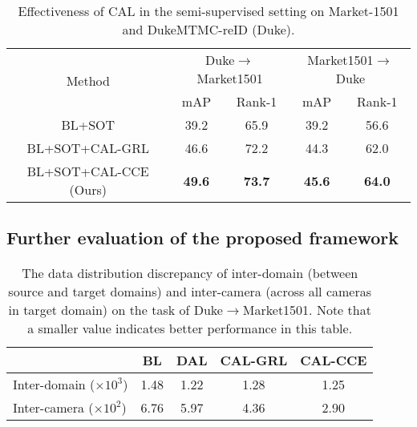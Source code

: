 \documentclass[10pt,twocolumn,letterpaper]{article}
\begin{document}
\begin{table}[htbp]
 \centering
 \caption{Effectiveness of CAL in the semi-supervised setting on Market-1501 and DukeMTMC-reID (Duke).}
 \begin{adjustbox}{width=0.48\textwidth}
   \begin{tabular}{|c|cc|cc|}
   \toprule
   \multirow{2}[2]{*}{Method} & \multicolumn{2}{c|}{Duke$\rightarrow$Market1501} & \multicolumn{2}{c|}{Market1501$\rightarrow$Duke} \\
\cmidrule{2-5}         & mAP  & Rank-1 & mAP  & Rank-1 \\
   \midrule
    BL+SOT & 39.2 & 65.9 & 39.2 & 56.6 \\
    \midrule
   BL+SOT+CAL-GRL & 46.6 & 72.2 & 44.3 & 62.0 \\
   BL+SOT+CAL-CCE (Ours)& \textcolor[rgb]{ 1, 0, 0}{\textbf{49.6}} & \textcolor[rgb]{ 1, 0, 0}{\textbf{73.7}} & \textcolor[rgb]{ 1, 0, 0}{\textbf{45.6}} & \textcolor[rgb]{ 1, 0, 0}{\textbf{64.0}} \\
   \bottomrule
   \end{tabular}\end{adjustbox}
 \label{tab05}\vspace*{-10pt}
\end{table}

\subsection{Further evaluation of the proposed framework}\label{sec:EXP-FECAL}


\begin{table}[htbp]
 \centering
 \caption{The data distribution discrepancy of inter-domain (between source and target domains) and inter-camera (across all cameras in target domain) on the task of Duke$\rightarrow$Market1501. Note that a smaller value indicates better performance in this table.}
 \begin{adjustbox}{width=0.45\textwidth}
   \begin{tabular}{|l|c|c|c|c|}
   \toprule
         & BL   & DAL  & CAL-GRL & CAL-CCE \\
   \midrule
Inter-domain ($\times 10^3$) & 1.48 & 1.22 & 1.28 & 1.25 \\
   \midrule
Inter-camera ($\times 10^2$) & 6.76 & 5.97 & 4.36 & 2.90 \\
 \midrule
   \end{tabular}\end{adjustbox}
 \label{tab06}\vspace*{-15pt}
\end{table}
\end{document}
